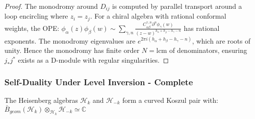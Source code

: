 \begin{proof}
The monodromy around $D_{ij}$ is computed by parallel transport around a loop encircling where $z_i = z_j$. For a chiral algebra with rational conformal weights, the OPE:
$\phi_\alpha(z)\phi_\beta(w) \sim \sum_{\gamma,n} \frac{C^{\gamma,n}_{\alpha\beta}\partial^n\phi_\gamma(w)}{(z-w)^{h_\alpha + h_\beta - h_\gamma - n}}$
has rational exponents. The monodromy eigenvalues are $e^{2\pi i(h_\alpha + h_\beta - h_\gamma - n)}$, which are roots of unity. Hence the monodromy has finite order $N = \text{lcm}$ of denominators, ensuring $j_*j^*$ exists as a D-module with regular singularities.
\end{proof}

\subsubsection{Self-Duality Under Level Inversion - Complete}

\begin{theorem}
The Heisenberg algebras $\mathcal{H}_k$ and $\mathcal{H}_{-k}$ form a curved Koszul pair with:
$\bar{B}_{geom}(\mathcal{H}_k) \otimes_{\mathcal{H}_k} \mathcal{H}_{-k} \simeq \mathbb{C}$
\end{theorem}


